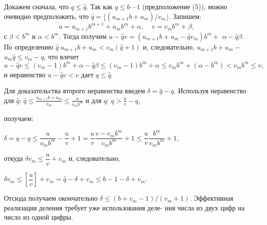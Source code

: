 Докажем сначала, что $q\leqslant\widehat{q}$. Так как $q\leqslant b — 1$ (предположение (5)),
можно очевидно предположить, что $\widehat{q}=\lfloor(u_{m+1}b+u_{m})/v_{m}\rfloor$. Запишем:
$$u=u_{m+1}b^{m+1}+u_{m}b^m+\alpha,\;\;\;\;v=v_{m}b^m+\beta,$$
с $\beta<b^m$ и $\alpha<b^m$. Тогда получим $u-\widehat{q}v=(u_{m+1}b+u_{m}-\widehat{q}v_{m})b^m+$\linebreak
$\alpha-\widehat{q}\beta$. По определению $\widehat{q}\;u_{m+1}b+u_{m}<v_{m}(\widehat{q}+1)$ и, следовательно, $u_{m+1}b+u_{m}-$ \linebreak $u_{m}\widehat{q}\leqslant v_{m}-q$, что влечет
$$u-\widehat{q}v\leqslant(v_{m}-1)b^m+\alpha-\widehat{q}\beta\leqslant(v_{m}-1)b^m+\alpha\leqslant v_{m}b^m+(\alpha-b^m)<v_{m}b^m\leqslant v,$$
и неравенство $u-\widehat{q}v<v$ дает $q\leqslant\widehat{q}$.

Для доказательства второго неравенства введем $\delta=\widehat{q}-q$. Используя неравенство для $\widehat{q}$: $\widehat{q}\leqslant\frac{u_{m+1}b+u_{m}}{v_{m}
}\leqslant\frac{u}{v_{m}b^m}$ и для $q$: $q>\frac{u}{v}-q$,
\newpage

\noindent
получаем:
\begin{center}
$\delta=\hat{q}-q\leqslant\dfrac{u}{v_mb^m}-\dfrac{u}{v}+1=\dfrac{u}{v}\dfrac{v-v_mb^m}{v_mb^m}+1\leqslant\dfrac{u}{v}\dfrac{b^m}{v_mb^m}+1$,
\end{center}
откуда $\delta{v_m\leqslant{\dfrac{u}{v}}+v_m}$ и, следовательно,
\begin{center}
$\delta{v_m}\leqslant\left[\dfrac{u}{v}\right]+v_m=\hat{q}-\delta+v_m\leqslant{b-1-\delta+v_m}$.
\end{center}
Отсюда получаем окончательно $\delta\leqslant(b+v_m-1)/(v_m+1)$.\newline
\hspace*{15pt}Эффективная реализация деления требует уже использования деле-\linebreak
ния числа из двух цифр на число из одной цифры.\\

